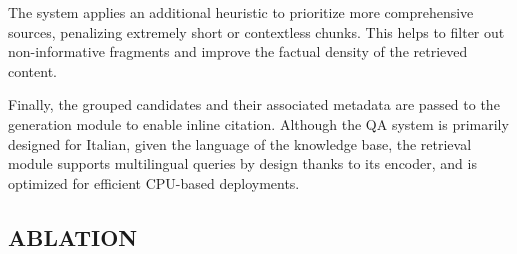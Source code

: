 \begin{spacing}{1.5}
The system applies an additional heuristic to prioritize more comprehensive sources, penalizing extremely short or contextless chunks. This helps to filter out non-informative fragments and improve the factual density of the retrieved content.

Finally, the grouped candidates and their associated metadata are passed to the generation module to enable inline citation. Although the QA system is primarily designed for Italian, given the language of the knowledge base, the retrieval module supports multilingual queries by design thanks to its encoder, and is optimized for efficient CPU-based deployments.

\subsection{ABLATION}



\end{spacing}
